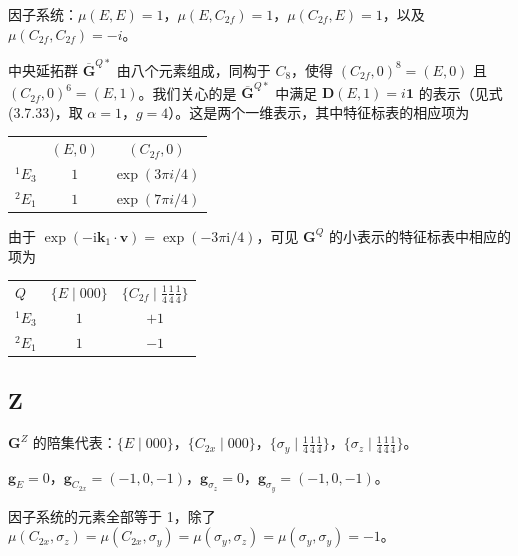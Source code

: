 因子系统：$\mu(E, E) = 1$，$\mu(E, C_{2f}) = 1$，$\mu(C_{2f}, E) = 1$，以及 $\mu(C_{2f}, C_{2f}) = -i$。

中央延拓群 $\overline{\mathbf{G}}^{Q*}$ 由八个元素组成，同构于 $C_{8}$，使得 $(C_{2f}, 0)^{8} = (E, 0)$ 且 $(C_{2f}, 0)^{6} = (E, 1)$。我们关心的是 $\overline{\mathbf{G}}^{Q*}$ 中满足 $\mathbf{D}(E, 1) = i\mathbf{1}$ 的表示（见式 (3.7.33)，取 $\alpha = 1$，$g = 4$）。这是两个一维表示，其中特征标表的相应项为
\begin{center}
\begin{tabular}{lcc}
 & $(E, 0)$ & $(C_{2f}, 0)$\\
${}^{1}E_{3}$ & $1$ & $\exp(3\pi i/4)$\\
${}^{2}E_{1}$ & $1$ & $\exp(7\pi i/4)$
\end{tabular}
\end{center}
由于 $\exp(-\mathrm{i}\mathbf{k}_{1} \cdot \mathbf{v}) = \exp(-3\pi\mathrm{i}/4)$，可见 $\mathbf{G}^{Q}$ 的小表示的特征标表中相应的项为
\begin{center}
\begin{tabular}{lcc}
$Q$ & $\{E \mid 000\}$ & $\{C_{2f} \mid {\frac{1}{4}}{\frac{1}{4}}{\frac{1}{4}}\}$\\
${}^{1}E_{3}$ & $1$ & $+1$\\
${}^{2}E_{1}$ & $1$ & $-1$
\end{tabular}
\end{center}

\subsection*{Z}

$\mathbf{G}^{Z}$ 的陪集代表：$\{E \mid 000\}$，$\{C_{2x} \mid 000\}$，$\{\sigma_{y} \mid {\frac{1}{4}}{\frac{1}{4}}{\frac{1}{4}}\}$，$\{\sigma_{z} \mid {\frac{1}{4}}{\frac{1}{4}}{\frac{1}{4}}\}$。

\begin{center}
$\mathbf{g}_{E} = 0$，$\mathbf{g}_{C_{2x}} = (-1, 0, -1)$，$\mathbf{g}_{\sigma_{z}} = 0$，$\mathbf{g}_{\sigma_{y}} = (-1, 0, -1)$。
\end{center}

因子系统的元素全部等于 1，除了 $\mu(C_{2x}, \sigma_{z}) = \mu(C_{2x}, \sigma_{y}) = \mu(\sigma_{y}, \sigma_{z}) = \mu(\sigma_{y}, \sigma_{y}) = -1$。

